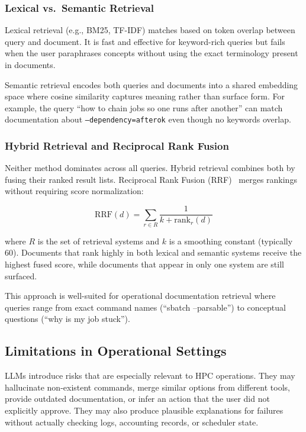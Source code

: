 \subsubsection{Lexical vs.\ Semantic Retrieval}

Lexical retrieval (e.g., BM25, TF-IDF) matches based on token overlap between query and document. It is fast and effective for keyword-rich queries but fails when the user paraphrases concepts without using the exact terminology present in documents.

Semantic retrieval encodes both queries and documents into a shared embedding space where cosine similarity captures meaning rather than surface form. For example, the query ``how to chain jobs so one runs after another'' can match documentation about \texttt{--dependency=afterok} even though no keywords overlap.

\subsubsection{Hybrid Retrieval and Reciprocal Rank Fusion}

Neither method dominates across all queries. Hybrid retrieval combines both by fusing their ranked result lists. Reciprocal Rank Fusion (RRF)~\cite{cormack2009reciprocal} merges rankings without requiring score normalization:

\begin{equation}
    \text{RRF}(d) = \sum_{r \in R} \frac{1}{k + \text{rank}_r(d)}
\end{equation}

where $R$ is the set of retrieval systems and $k$ is a smoothing constant (typically 60). Documents that rank highly in both lexical and semantic systems receive the highest fused score, while documents that appear in only one system are still surfaced.

This approach is well-suited for operational documentation retrieval where queries range from exact command names (``sbatch --parsable'') to conceptual questions (``why is my job stuck'').

\subsection{Limitations in Operational Settings}

LLMs introduce risks that are especially relevant to HPC operations. They may hallucinate non-existent commands, merge similar options from different tools, provide outdated documentation, or infer an action that the user did not explicitly approve. They may also produce plausible explanations for failures without actually checking logs, accounting records, or scheduler state.


